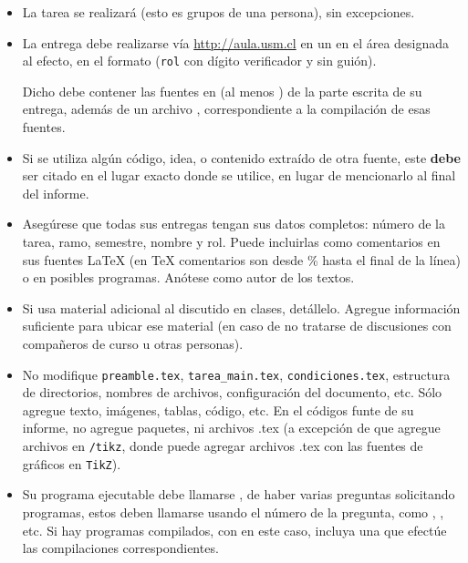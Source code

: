   \begin{itemize}
  \item
    La tarea se realizará 
    (esto es grupos de una persona),
    sin excepciones.
  \item
    La entrega debe realizarse vía \url{http://aula.usm.cl}
    en un  en el área designada al efecto,
    en el formato 
    (\texttt{rol} con dígito verificador y sin guión).

    Dicho  debe contener las fuentes en \LaTeXe{}
    (al menos )
    de la parte escrita de su entrega,
    además de un archivo ,
    correspondiente a la compilación de esas fuentes.
  \item Si se utiliza algún código, idea, o contenido extraído de otra fuente, este \textbf{debe} ser citado en el lugar exacto donde se utilice, en lugar de mencionarlo al final del informe. 
  \item
    Asegúrese que todas sus entregas tengan sus datos completos:
    número de la tarea, ramo, semestre, nombre y rol.
    Puede incluirlas como comentarios en sus fuentes \LaTeX{}
    (en \TeX{} comentarios son desde \% hasta el final de la línea)
    o en posibles programas.
    Anótese como autor de los textos.
 
  \item
    Si usa material adicional al discutido en clases,
    detállelo.
    Agregue información suficiente para ubicar ese material
    (en caso de no tratarse de discusiones con compañeros de curso
     u otras personas).
  \item No modifique \texttt{preamble.tex}, \texttt{tarea\_main.tex}, \texttt{condiciones.tex}, estructura de directorios, nombres de archivos, configuración del documento, etc. Sólo agregue texto, imágenes, tablas, código, etc. En el códigos funte de su informe, no agregue paquetes, ni archivos .tex (a excepción de que agregue archivos en \texttt{/tikz}, donde puede agregar archivos .tex con las fuentes de gráficos en \texttt{TikZ}).

\ifprograms
  \item
    Su programa ejecutable debe llamarse ,
    de haber varias preguntas solicitando programas,
    estos deben llamarse usando el número de la pregunta,
    como ,
    ,
    etc.
    Si hay programas compilados, con en este caso,
    incluya una 
    que efectúe las compilaciones correspondientes.


\end{itemize}
